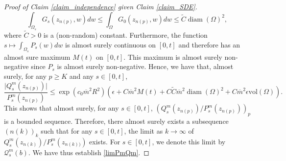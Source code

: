 \documentclass{article}
\newcommand{\eps}{{\epsilon}}
\theoremstyle{definition}
\theoremstyle{remark}
\theoremstyle{remark}
\begin{document}
\begin{proof}[Proof of Claim \ref{claim_independence} given Claim \ref{claim_SDE}]
\begin{equation*}
    \int_{\Omega_s} G_s(z_{n(p)}, w) dw \leq \int_{\Omega} G_0(z_{n(p)},w) dw \leq \tilde C \operatorname{diam}(\Omega)^2,
\end{equation*}
where $\tilde C > 0$ is a (non-random) constant. Furthermore, the function $s \mapsto \int_{\Omega_s} P_s(w) dw$ is almost surely continuous on $[0,t]$ and therefore has an almost sure maximum $M(t)$ on $[0,t]$. This maximum is almost surely non-negative since $P_s$ is almost surely non-negative. Hence, we have that, almost surely, for any $p \geq K$ and any $s \in [0,t]$,
\begin{equation} \label{eq_QmP_final}
    \frac{\vert Q_s^m(z_{n(p)}) \vert}{P_s^m(z_{n(p)})} \leq \exp(c_0\overline{m}^2R^2)(\eps + C\overline{m}^2M(t) + C \tilde C \overline{m}^2 \operatorname{diam}(\Omega)^2+C\overline{m}^2\eps \text{vol}(\Omega)).
\end{equation}
This shows that almost surely, for any $s \in [0,t]$, $( Q_s^m(z_{n(p)}) / P_s^m(z_{n(p)}))_p$ is a bounded sequence. Therefore, there almost surely exists a subsequence $(n(k))_{k}$ such that for any $s \in [0,t]$, the limit as $ k \to \infty$ of $ Q_s^m(z_{n(k)})/P_s^m(z_{n(k))})$ exists. For $s \in [0,t]$, we denote this limit by $\mathcal{Q}_s^m(b)$. We have thus establish \eqref{limPmQm}.


\end{proof}
\end{document}
